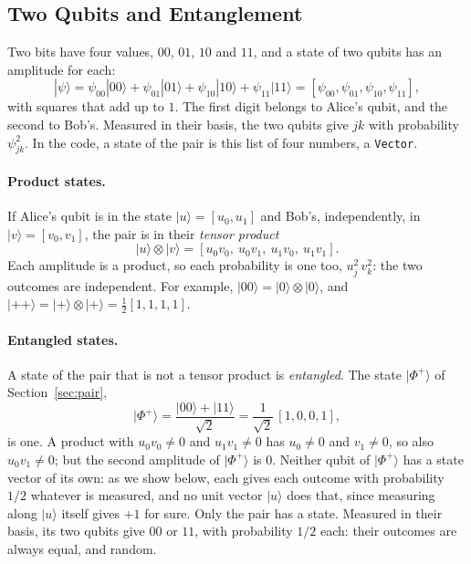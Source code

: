 \documentclass[11pt]{article}
\newcommand{\hs}{\lstinline[style=hask,basicstyle=\ttfamily,frame=none]}
\begin{document}
\subsection{Two Qubits and Entanglement}\label{app:pair}

Two bits have four values, $00$, $01$, $10$ and $11$, and a state of two qubits has an amplitude for each:
\[
  |\psi\rangle = \psi_{00}|00\rangle + \psi_{01}|01\rangle + \psi_{10}|10\rangle + \psi_{11}|11\rangle = [\psi_{00}, \psi_{01}, \psi_{10}, \psi_{11}],
\]
with squares that add up to $1$. The first digit belongs to Alice's qubit, and the second to Bob's. Measured in their basis, the two qubits give $jk$ with probability $\psi_{jk}^2$. In the code, a state of the pair is this list of four numbers, a \hs|Vector|.

\paragraph{Product states.} If Alice's qubit is in the state $|u\rangle = [u_0, u_1]$ and Bob's, independently, in $|v\rangle = [v_0, v_1]$, the pair is in their \emph{tensor product}
\[
  |u\rangle \otimes |v\rangle = [u_0 v_0,\ u_0 v_1,\ u_1 v_0,\ u_1 v_1].
\]
Each amplitude is a product, so each probability is one too, $u_j^2\, v_k^2$: the two outcomes are independent. For example, $|00\rangle = |0\rangle \otimes |0\rangle$, and $|{+}{+}\rangle = |{+}\rangle \otimes |{+}\rangle = \frac12[1, 1, 1, 1]$.

\paragraph{Entangled states.} A state of the pair that is not a tensor product is \emph{entangled}. The state $|\Phi^+\rangle$ of Section~\ref{sec:pair},
\[
  |\Phi^+\rangle = \frac{|00\rangle + |11\rangle}{\sqrt2} = \frac{1}{\sqrt2}\,[1, 0, 0, 1],
\]
is one. A product with $u_0 v_0 \neq 0$ and $u_1 v_1 \neq 0$ has $u_0 \neq 0$ and $v_1 \neq 0$, so also $u_0 v_1 \neq 0$; but the second amplitude of $|\Phi^+\rangle$ is $0$. Neither qubit of $|\Phi^+\rangle$ has a state vector of its own: as we show below, each gives each outcome with probability $1/2$ whatever is measured, and no unit vector $|u\rangle$ does that, since measuring along $|u\rangle$ itself gives $+1$ for sure. Only the pair has a state. Measured in their basis, its two qubits give $00$ or $11$, with probability $1/2$ each: their outcomes are always equal, and random.
\end{document}
